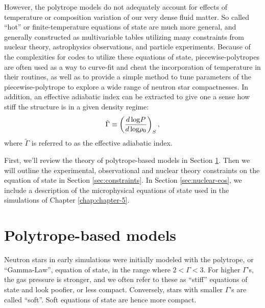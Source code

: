 However, the polytrope models do not adequately account for effects of temperature or composition variation of our very dense fluid matter.  
So called ``hot'' or finite-temperature equations of state are much more general, and generally constructed as multivariable tables utilizing many constraints from nuclear theory, astrophysics observations, and particle experiments.
Because of the complexities for codes to utilize these equations of state, piecewise-polytropes are often used as a way to curve-fit and cheat the incorporation of temperature in their routines, as well as to provide a simple method to tune parameters of the piecewise-polytrope to explore a wide range of neutron star compactnesses.
In addition, an effective adiabatic index can be extracted to give one a sense how stiff the structure is in a given density regime:
\begin{align}
\label{e:adiabat}
\tilde{\Gamma} \equiv \left( \frac{d\, {\rm log} P}{d\, {\rm log} \rho_0} \right) _S,
\end{align}
where $\tilde{\Gamma}$ is referred to as the effective adiabatic index.

First, we'll review the theory of polytrope-based models in Section \ref{sec:polytropes}. Then we will outline the experimental, observational and nuclear theory constraints on the equation of state in Section \ref{sec:constraints}.   In Section \ref{sec:nuclear-eos}, we include a description of the microphysical equations of state used in the simulations of Chapter \ref{chap:chapter-5}. 


\section{Polytrope-based models}
\label{sec:polytropes}

Neutron stars in early simulations were initially modeled with the polytrope, or ``Gamma-Law'', equation of state, in the range where $2 < \Gamma < 3$.
For higher $\Gamma$'s, the gas pressure is stronger, and we often refer to these as ``stiff'' equations of state and look poofier, or less compact.
Conversely, stars with smaller $\Gamma$'s are called ``soft''.  Soft equations of state are hence more compact.

